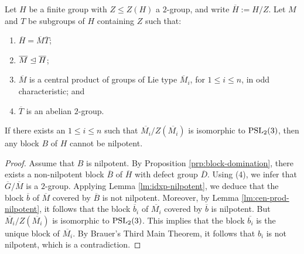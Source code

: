 \documentclass[bysection, amsart]{standard}
\begin{document}
\begin{lemma} \label{lm:smaller-sl23}
    Let $H$ be a finite group with $Z \leq Z(H)$ a $2$-group, and write $\overline{H} := H/Z$. Let $M$ and $T$ be subgroups of $H$ containing $Z$ such that:
    \begin{enumerate}
        \item $\overline{H} = \overline{M} \overline{T}$;
        \item $\overline{M} \trianglelefteq \overline{H}$;
        \item $\overline{M}$ is a central product of groups of Lie type $\overline{M}_i$, for $1 \leq i \leq n$, in odd characteristic; and
        \item $\overline{T}$ is an abelian $2$-group.
    \end{enumerate}
    If there exists an $1 \leq i \leq n$ such that $\overline{M_i}/Z(\overline{M_i})$ is isomorphic to $\operatorname{PSL}_2(3)$, then any block $B$ of $H$ cannot be nilpotent.
\end{lemma}
\begin{proof}
    Assume that $B$ is nilpotent. By Proposition \ref{prp:block-domination}, there exists a non-nilpotent block $\overline{B}$ of $\overline{H}$ with defect group $\overline{D}$. Using (4), we infer that $\overline{G}/\overline{M}$ is a $2$-group. Applying Lemma \ref{lm:idxp-nilpotent}, we deduce that the block $\overline{b}$ of $\overline{M}$ covered by $\overline{B}$ is not nilpotent. Moreover, by Lemma \ref{lm:cen-prod-nilpotent}, it follows that the block $\overline{b}_i$ of $\overline{M_i}$ covered by $\overline{b}$ is nilpotent. But $\overline{M_i}/Z(\overline{M_i})$ is isomorphic to $\operatorname{PSL}_2(3)$. This implies that the block $\overline{b_i}$ is the unique block of $\overline{M_i}$. By Brauer's Third Main Theorem, it follows that $b_i$ is not nilpotent, which is a contradiction.
\end{proof}
\end{document}
